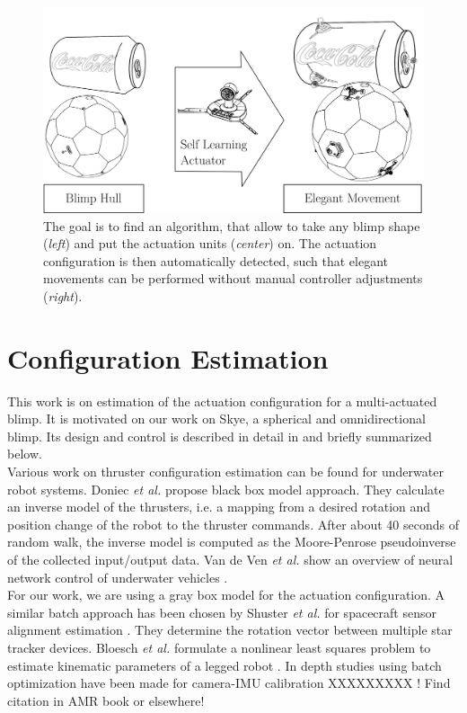 \begin{figure}[hbtp]
\label{fig:motivation}
\centering
\includegraphics[width=.85\linewidth]{images/motivation.png}
\caption{The goal is to find an algorithm, that allow to take any blimp shape (\textit{left}) and put the actuation units (\textit{center}) on. The actuation configuration is then automatically detected, such that elegant movements can be performed without manual controller adjustments (\textit{right}).}
\end{figure}


\section{Configuration Estimation}
This work is on estimation of the actuation configuration for a multi-actuated blimp.
It is motivated on our work on Skye, a spherical and omnidirectional blimp.
Its design and control is described in detail in \citep{Skye2013} and briefly summarized below. \\
Various work on thruster configuration estimation can be found for underwater robot systems.
Doniec \textit{et al.} \citep{Doniec} propose black box model approach.
They calculate an inverse model of the thrusters, i.e. a mapping from a desired rotation and position change of the robot to the thruster commands. After about 40 seconds of random walk, the inverse model is computed as the Moore-Penrose pseudoinverse of the collected input/output data.
Van de Ven \textit{et al.} show an overview of neural network control of underwater vehicles \cite{VandeVen2005}. \\ 
For our work, we are using a gray box model for the actuation configuration.
A similar batch approach has been chosen by Shuster \textit{et al.} for spacecraft sensor alignment estimation \citep{Shuster1991}.
They determine the rotation vector between multiple star tracker devices. Bloesch \textit{et al.} formulate a nonlinear least squares problem to estimate kinematic parameters of a legged robot \citep{Bloesch2013}.
In depth studies using batch optimization have been made for camera-IMU calibration XXXXXXXXX 
! Find citation in AMR book or elsewhere!


